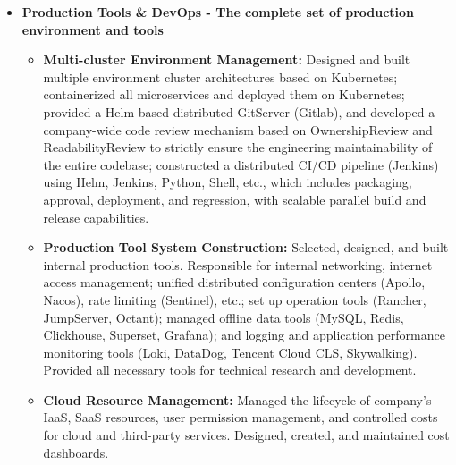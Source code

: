 \documentclass[letterpaper,11pt]{article}
\begin{document}
\begin{spacing}{1.0}
\begin{itemize}
\begin{itemize}
			\item \textbf{Production Tools \& DevOps - The complete set of production environment and tools}
			\begin{itemize}
				\item \textbf{Multi-cluster Environment Management: }Designed and built multiple environment cluster architectures based on Kubernetes; containerized all microservices and deployed them on Kubernetes; provided a Helm-based distributed GitServer (Gitlab), and developed a company-wide code review mechanism based on OwnershipReview and ReadabilityReview to strictly ensure the engineering maintainability of the entire codebase; constructed a distributed CI/CD pipeline (Jenkins) using Helm, Jenkins, Python, Shell, etc., which includes packaging, approval, deployment, and regression, with scalable parallel build and release capabilities.
				\item \textbf{Production Tool System Construction: }Selected, designed, and built internal production tools. Responsible for internal networking, internet access management; unified distributed configuration centers (Apollo, Nacos), rate limiting (Sentinel), etc.; set up operation tools (Rancher, JumpServer, Octant); managed offline data tools (MySQL, Redis, Clickhouse, Superset, Grafana); and logging and application performance monitoring tools (Loki, DataDog, Tencent Cloud CLS, Skywalking). Provided all necessary tools for technical research and development.
				\item \textbf{Cloud Resource Management: }Managed the lifecycle of company's IaaS, SaaS resources, user permission management, and controlled costs for cloud and third-party services. Designed, created, and maintained cost dashboards.
			\end{itemize}
			

\end{itemize}
\end{itemize}
\end{spacing}
\end{document}
